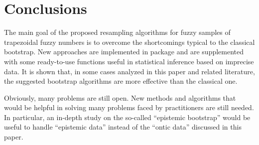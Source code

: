 \section{Conclusions}

The main goal of the proposed resampling algorithms for fuzzy samples of trapezoidal fuzzy numbers is to overcome the shortcomings typical to the classical bootstrap.
New approaches are implemented in  package and are supplemented with some ready-to-use functions useful in statistical inference based on imprecise data.
It is shown that, in some cases analyzed in this paper and related literature, the suggested bootstrap algorithms are more effective than the classical one.

Obviously, many problems are still open. New methods and algorithms that would be helpful in solving many problems faced by practitioners are still needed. In particular, an in-depth study on the so-called ``epistemic bootstrap'' \citep{grzegorzewski2021} would be useful to handle ``epistemic data'' instead of the ``ontic data'' \citep{Couso2014} discussed in this paper.


  

  

  
  \address{Maciej Romaniuk\\
    Systems Research Institute, Polish Academy of Sciences\\
    Newelska 6, 01-447 Warsaw\\
    Poland\\
    (0000-0001-9649-396X)\\
    }
  
  \address{Przemys{\l}aw Grzegorzewski\\
    Faculty of Mathematics and Information Science, Warsaw University of Technology \\
    Koszykowa 75, 00-662 Warsaw\\
    Poland\\
    Systems Research Institute, Polish Academy of Sciences\\
        Newelska 6, 01-447 Warsaw\\
        Poland\\
    (0000-0002-5191-4123)\\
    }
  
  

